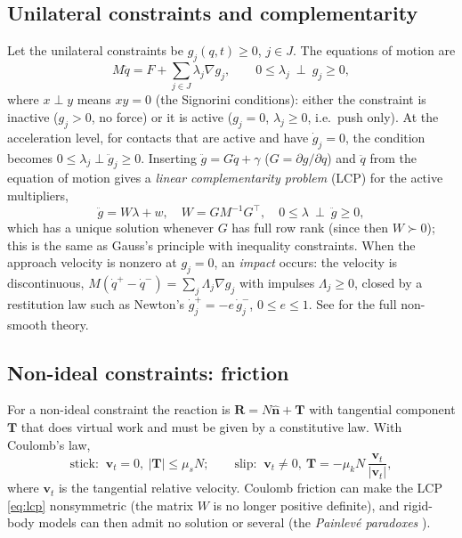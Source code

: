 \documentclass[11pt,a4paper]{article}
\theoremstyle{definition}
\theoremstyle{plain}
\theoremstyle{remark}
\newcommand{\compl}{\perp}                 %
\newcommand{\transp}{^{\!\top}}
\begin{document}
\subsection{Unilateral constraints and complementarity}\label{sec:unilateral}
Let the unilateral constraints be $g_j(q,t)\ge0$, $j\in J$. The equations of motion are
\begin{equation}\label{eq:signorini}
  M\ddot q=F+\sum_{j\in J}\lambda_j\nabla g_j,\qquad
  0\le\lambda_j\ \compl\ g_j\ge0 ,
\end{equation}
where $x\compl y$ means $xy=0$ (the Signorini conditions): either the constraint is
inactive ($g_j>0$, no force) or it is active ($g_j=0$, $\lambda_j\ge0$, i.e.\ push only).
At the acceleration level, for contacts that are active and have $\dot g_j=0$, the
condition becomes $0\le\lambda_j\compl\ddot g_j\ge0$. Inserting $\ddot g=G\ddot q+\gamma$
($G=\partial g/\partial q$) and $\ddot q$ from the equation of motion gives a
\emph{linear complementarity problem} (LCP) for the active multipliers,
\begin{equation}\label{eq:lcp}
  \ddot g=W\lambda+w,\quad W=GM^{-1}G\transp,\quad 0\le\lambda\ \compl\ \ddot g\ge0,
\end{equation}
which has a unique solution whenever $G$ has full row rank (since then $W\succ0$); this
is the same as Gauss's principle with inequality constraints.
When the approach velocity is nonzero at $g_j=0$, an \emph{impact} occurs: the velocity is
discontinuous, $M(\dot q^+-\dot q^-)=\sum_j\Lambda_j\nabla g_j$ with impulses $\Lambda_j\ge0$,
closed by a restitution law such as Newton's $\dot g_j^+=-e\,\dot g_j^-$, $0\le e\le1$.
See \cite{Moreau1988,PfeifferGlocker1996,Brogliato2016} for the full non-smooth theory.

\subsection{Non-ideal constraints: friction}\label{sec:friction}
For a non-ideal constraint the reaction is $\mathbf R=N\hat{\mathbf n}+\mathbf T$ with
tangential component $\mathbf T$ that does virtual work and must be given by a
constitutive law. With Coulomb's law,
\begin{equation}\label{eq:coulomb}
  \text{stick: }\ \mathbf v_t=0,\ |\mathbf T|\le\mu_sN;\qquad
  \text{slip: }\ \mathbf v_t\ne0,\ \mathbf T=-\mu_kN\,\frac{\mathbf v_t}{|\mathbf v_t|},
\end{equation}
where $\mathbf v_t$ is the tangential relative velocity. Coulomb friction can make the
LCP \eqref{eq:lcp} nonsymmetric (the matrix $W$ is no longer positive definite), and
rigid-body models can then admit no solution or several (the \emph{Painlev\'e paradoxes}
\cite{Brogliato2016}).
\end{document}
